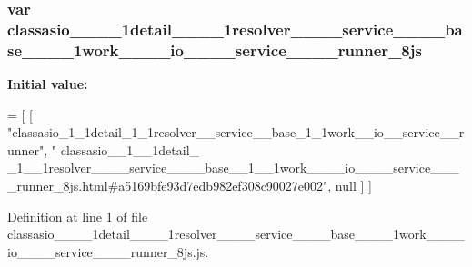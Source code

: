 \subsubsection[{classasio\+\_\+\+\_\+1\+\_\+\+\_\+1detail\+\_\+\+\_\+1\+\_\+\+\_\+1resolver\+\_\+\+\_\+\+\_\+\+\_\+service\+\_\+\+\_\+\+\_\+\+\_\+base\+\_\+\+\_\+1\+\_\+\+\_\+1work\+\_\+\+\_\+\+\_\+\+\_\+io\+\_\+\+\_\+\+\_\+\+\_\+service\+\_\+\+\_\+\+\_\+\+\_\+runner\+\_\+8js}]{\setlength{\rightskip}{0pt plus 5cm}var classasio\+\_\+\+\_\+\_\+\+\_\+1detail\+\_\+\+\_\+\_\+\+\_\+1resolver\+\_\+\+\_\+\+\_\+\+\_\+service\+\_\+\+\_\+\+\_\+\+\_\+base\+\_\+\+\_\+\_\+\+\_\+1work\+\_\+\+\_\+\+\_\+\+\_\+io\+\_\+\+\_\+\+\_\+\+\_\+service\+\_\+\+\_\+\+\_\+\+\_\+runner\+\_\+8js}\label{classasio____1____1detail____1____1resolver________service________base____1____1work________io__d7948e36165e341eb479589b6b7073e6_ad568dfbecba0b0428a1bb0fd303785ef}
{\bfseries Initial value\+:}
\begin{DoxyCode}
=
[
    [ \textcolor{stringliteral}{"classasio\_1\_1detail\_1\_1resolver\_\_service\_\_base\_1\_1work\_\_io\_\_service\_\_runner"}, \textcolor{stringliteral}{"
      classasio\_\_1\_\_1detail\_
      \_1\_\_1resolver\_\_\_\_service\_\_\_\_base\_\_1\_\_1work\_\_\_\_io\_\_\_\_service\_\_\_\_runner\_8js.html#a5169bfe93d7edb982ef308c90027e002"}, null ]
]
\end{DoxyCode}


Definition at line 1 of file classasio\+\_\+\+\_\+\_\+\+\_\+1detail\+\_\+\+\_\+\_\+\+\_\+1resolver\+\_\+\+\_\+\+\_\+\+\_\+service\+\_\+\+\_\+\+\_\+\+\_\+base\+\_\+\+\_\+\_\+\+\_\+1work\+\_\+\+\_\+\+\_\+\+\_\+io\+\_\+\+\_\+\+\_\+\+\_\+service\+\_\+\+\_\+\+\_\+\+\_\+runner\+\_\+8js.\+js.

